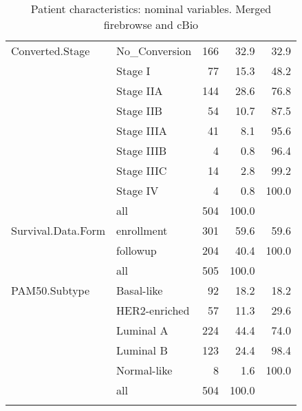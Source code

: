 \begin{longtable}{ll|rrr}
   \hline
\hline
Converted.Stage & No_Conversion & 166 & 32.9 & 32.9 \\ 
   & Stage I & 77 & 15.3 & 48.2 \\ 
   & Stage IIA & 144 & 28.6 & 76.8 \\ 
   & Stage IIB & 54 & 10.7 & 87.5 \\ 
   & Stage IIIA & 41 & 8.1 & 95.6 \\ 
   & Stage IIIB & 4 & 0.8 & 96.4 \\ 
   & Stage IIIC & 14 & 2.8 & 99.2 \\ 
   & Stage IV & 4 & 0.8 & 100.0 \\ 
   \hline
 & all & 504 & 100.0 &  \\ 
   \hline
\hline
Survival.Data.Form & enrollment & 301 & 59.6 & 59.6 \\ 
   & followup & 204 & 40.4 & 100.0 \\ 
   \hline
 & all & 505 & 100.0 &  \\ 
   \hline
\hline
PAM50.Subtype & Basal-like & 92 & 18.2 & 18.2 \\ 
   & HER2-enriched & 57 & 11.3 & 29.6 \\ 
   & Luminal A & 224 & 44.4 & 74.0 \\ 
   & Luminal B & 123 & 24.4 & 98.4 \\ 
   & Normal-like & 8 & 1.6 & 100.0 \\ 
   \hline
 & all & 504 & 100.0 &  \\ 
   \hline
\hline
\hline
\caption{Patient characteristics: nominal variables. Merged firebrowse and cBio} 
\label{tab: nominal1}
\end{longtable}
\endgroup

